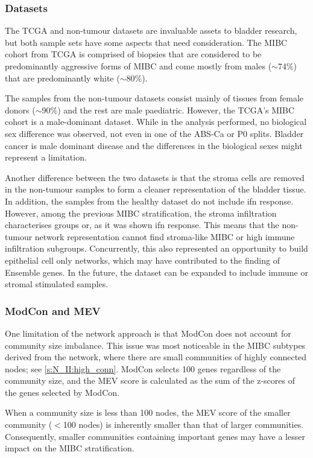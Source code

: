 \subsubsection*{Datasets}

The TCGA and non-tumour datasets are invaluable assets to bladder research, but both sample sets have some aspects that need consideration. The MIBC cohort from TCGA is comprised of biopsies that are considered to be predominantly aggressive forms of MIBC and come mostly from males (\(\sim\)74\%) that are predominantly white (\(\sim\)80\%).

The samples from the non-tumour datasets consist mainly of tissues from female donors (\(\sim\)90\%) and the rest are male paediatric. However, the TCGA's MIBC cohort is a male-dominant dataset. While in the analysis performed, no biological sex difference was observed, not even in one of the ABS-Ca or P0 splits. Bladder cancer is male dominant disease and the differences in the biological sexes might represent a limitation.

Another difference between the two datasets is that the stroma cells are removed in the non-tumour samples to form a cleaner representation of the bladder tissue. In addition, the samples from the healthy dataset do not include \acrlong{ifn} response. However, among the previous MIBC stratification, the stroma infiltration characterises groups or, as it was shown \acrshort{ifn} response. This means that the non-tumour network representation cannot find stroma-like MIBC or high immune infiltration subgroups. Concurrently, this also represented an opportunity to build epithelial cell only networks, which may have contributed to the finding of Ensemble genes. In the future, the dataset can be expanded to include immune or stromal stimulated samples.

\subsubsection*{ModCon and MEV}

One limitation of the network approach is that ModCon does not account for community size imbalance. This issue was most noticeable in the MIBC subtypes derived from the network, where there are small communities of highly connected nodes; see \cref{s:N_II:high_conn}. ModCon selects 100 genes regardless of the community size, and the MEV score is calculated as the sum of the z-scores of the genes selected by ModCon.

When a community size is less than 100 nodes, the MEV score of the smaller community (\(<\)100 nodes) is inherently smaller than that of larger communities. Consequently, smaller communities containing important genes may have a lesser impact on the MIBC stratification.


